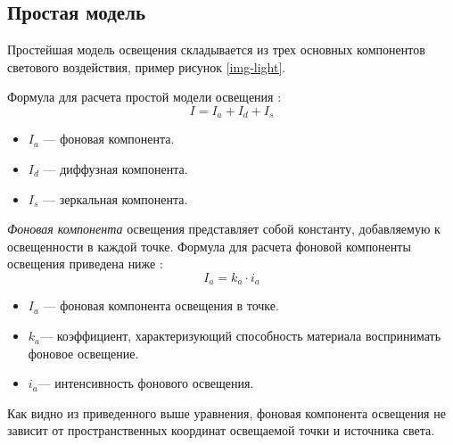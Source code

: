 \subsection{Простая модель}

Простейшая модель освещения складывается из трех основных компонентов светового воздействия, пример рисунок \ref{img-light}.


Формула для расчета простой модели освещения \cite{lightmodf}:
\begin{equation}
 I = I_{a} + I_{d} + I_{s}
\end{equation}
	
\begin{itemize}
	\item $I_{a}$ --- фоновая компонента.
	\item $I_{d}$ --- диффузная компонента.
	\item $I_{s}$ --- зеркальная компонента.
\end{itemize}

\textit{Фоновая компонента} освещения представляет собой константу, добавляемую к освещенности в каждой точке. Формула для расчета фоновой компоненты освещения приведена ниже \cite{lightmodf} : \begin{equation}
	I_{a}=k_{a} \cdot i_{a}
\end{equation}
\begin{itemize}
	\item $I_{a}$ --- фоновая компонента освещения в точке.
	\item $k_{a}$​ --- коэффициент, характеризующий способность материала воспринимать фоновое освещение.
	\item $i_{a}$​ --- интенсивность фонового освещения.
\end{itemize}

Как видно из приведенного выше уравнения, фоновая компонента освещения не зависит от пространственных координат освещаемой точки и источника света.

%
%
%
%



